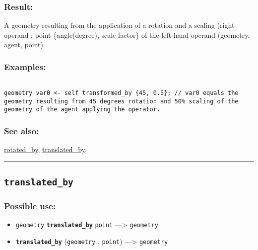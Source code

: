 \documentclass[]{book}
\providecommand{\tightlist}{%
  \setlength{\itemsep}{0pt}\setlength{\parskip}{0pt}}
\theoremstyle{definition}
\theoremstyle{definition}
\theoremstyle{definition}
\theoremstyle{remark}
\begin{document}
\subsubsection{Result:}\label{result-512}

A geometry resulting from the application of a rotation and a scaling
(right-operand : point \{angle(degree), scale factor\} of the left-hand
operand (geometry, agent, point)

\subsubsection{Examples:}\label{examples-367}

\begin{verbatim}
 
geometry var0 <- self transformed_by {45, 0.5}; // var0 equals the geometry resulting from 45 degrees rotation and 50% scaling of the geometry of the agent applying the operator.
\end{verbatim}

\subsubsection{See also:}\label{see-also-209}

\href{OperatorsNR\#rotated_by}{rotated\_by},
\href{OperatorsSZ\#translated_by}{translated\_by},

\begin{center}\rule{0.5\linewidth}{\linethickness}\end{center}

\subsection{\texorpdfstring{\texttt{translated\_by}}{translated\_by}}\label{translated_by}

\subsubsection{Possible use:}\label{possible-use-531}

\begin{itemize}
\tightlist
\item
  \texttt{geometry} \textbf{\texttt{translated\_by}} \texttt{point}
  ---\textgreater{} \texttt{geometry}
\item
  \textbf{\texttt{translated\_by}} (\texttt{geometry} , \texttt{point})
  ---\textgreater{} \texttt{geometry}
\end{itemize}
\end{document}

